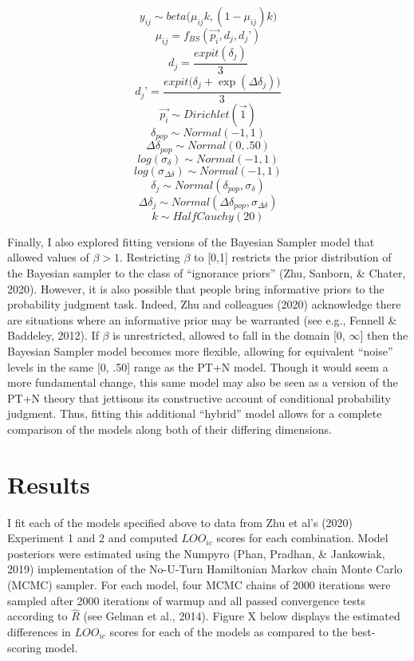 \documentclass[
  english,
  man,floatsintext]{apa6}
\begin{document}
\[y_{ij} \sim beta\big(\mu_{ij} k, (1-\mu_{ij})k\big)\]
\[\mu_{ij} = f_{BS}(\overrightarrow{p_i}, d_j, d_j’) \]
\[d_j = \frac{ expit(\delta_j )}{3}\]
\[ d_j’ = \frac{ expit\big( \delta_j  + \exp(\Delta\delta_j )\big) }{3}\]
\[ \overrightarrow{p_i} \sim Dirichlet(\overrightarrow{1})\]
\[ \delta_{pop} \sim Normal(-1, 1)\]
\[ \Delta\delta_{pop} \sim Normal(0, .50)\]
\[ log(\sigma_{\delta}) \sim Normal(-1, 1)\]
\[ log(\sigma_{\Delta\delta}) \sim Normal(-1, 1)\]
\[\delta_j \sim Normal(\delta_{pop}, \sigma_{\delta})\]
\[\Delta\delta_j \sim Normal(\Delta\delta_{pop}, \sigma_{\Delta\delta})\]
\[k \sim HalfCauchy(20)\]

Finally, I also explored fitting versions of the Bayesian Sampler model that allowed values of \(\beta > 1\). Restricting \(\beta\) to {[}0,1{]} restricts the prior distribution of the Bayesian sampler to the class of ``ignorance priors'' (Zhu, Sanborn, \& Chater, 2020). However, it is also possible that people bring informative priors to the probability judgment task. Indeed, Zhu and colleagues (2020) acknowledge there are situations where an informative prior may be warranted (see e.g., Fennell \& Baddeley, 2012). If \(\beta\) is unrestricted, allowed to fall in the domain {[}0, \(\infty\){]} then the Bayesian Sampler model becomes more flexible, allowing for equivalent ``noise'' levels in the same {[}0, .50{]} range as the PT+N model. Though it would seem a more fundamental change, this same model may also be seen as a version of the PT+N theory that jettisons its constructive account of conditional probability judgment. Thus, fitting this additional ``hybrid'' model allows for a complete comparison of the models along both of their differing dimensions.

\hypertarget{results}{%
\section{Results}\label{results}}

I fit each of the models specified above to data from Zhu et al's (2020) Experiment 1 and 2 and computed \(LOO_{ic}\) scores for each combination. Model posteriors were estimated using the Numpyro (Phan, Pradhan, \& Jankowiak, 2019) implementation of the No-U-Turn Hamiltonian Markov chain Monte Carlo (MCMC) sampler. For each model, four MCMC chains of 2000 iterations were sampled after 2000 iterations of warmup and all passed convergence tests according to \(\hat{R}\) (see Gelman et al., 2014). Figure X below displays the estimated differences in \(LOO_{ic}\) scores for each of the models as compared to the best-scoring model.
\end{document}
